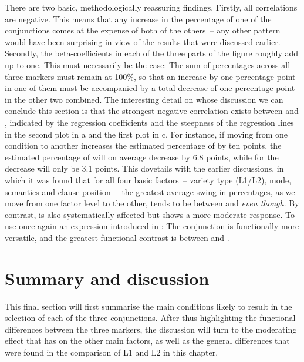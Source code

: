 There are two basic, methodologically reassuring findings. Firstly, all correlations are negative. This means that any increase in the percentage of one of the conjunctions comes at the expense of both of the others~– any other pattern would have been surprising in view of the results that were discussed earlier. Secondly, the beta-coefficients in each of the three parts of the figure roughly add up to one. This must necessarily be the case: The sum of percentages across all three markers must remain at 100\%, so that an increase by one percentage point in one of them must be accompanied by a total decrease of one percentage point in the other two combined. The interesting detail on whose discussion we can conclude this section is that the strongest negative correlation exists between  and , indicated by the regression coefficients and the steepness of the regression lines in the second plot in a and the first plot in c. For instance, if moving from one condition to another increases the estimated percentage of  by ten points, the estimated percentage of  will on average decrease by 6.8 points, while for  the decrease will only be 3.1 points. This dovetails with the earlier discussions, in which it was found that for all four basic factors~– variety type (L1/L2), mode, semantics and clause position~– the greatest average swing in percentages, as we move from one factor level to the other, tends to be between  and \textit{even though}. By contrast,  is also systematically affected but shows a more moderate response. To use once again an expression introduced in : The conjunction  is functionally more versatile, and the greatest functional contrast is between  and .

\section{\label{bkm:Ref59531919}\label{bkm:Ref59920988}Summary and discussion}\label{sec:10.3}\largerpage

This final section will first summarise the main conditions likely to result in the selection of each of the three conjunctions. After thus highlighting the functional differences between the three markers, the discussion will turn to the moderating effect that  has on the other main factors, as well as the general differences that were found in the comparison of L1 and L2  in this chapter.

